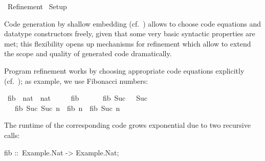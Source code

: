 %
\begin{isabellebody}%
\def\isabellecontext{Refinement}%
%
\isadelimtheory
%
\endisadelimtheory
%
\isatagtheory
{}\isamarkupfalse%
\ Refinement\isanewline
{}\ Setup\isanewline
{}%
\endisatagtheory
{\isafoldtheory}%
%
\isadelimtheory
%
\endisadelimtheory
%
\isamarkuptrue%
%
\begin{isamarkuptext}%
Code generation by shallow embedding (cf.~)
  allows to choose code equations and datatype constructors freely,
  given that some very basic syntactic properties are met; this
  flexibility opens up mechanisms for refinement which allow to extend
  the scope and quality of generated code dramatically.%
\end{isamarkuptext}%
\isamarkuptrue%
%
\isamarkuptrue%
%
\begin{isamarkuptext}%
Program refinement works by choosing appropriate code equations
  explicitly (cf.~\label{sec:equations}); as example, we use Fibonacci
  numbers:%
\end{isamarkuptext}%
\isamarkuptrue%
%
\isadelimquote
%
\endisadelimquote
%
\isatagquote
{}\isamarkupfalse%
\ fib\ {\isacharcolon}{\isacharcolon}\ {\isachardoublequoteopen}nat\ {\isasymRightarrow}\ nat{\isachardoublequoteclose}\ \isanewline
\ \ \ \ {\isachardoublequoteopen}fib\ {}\ {\isacharequal}\ {}{\isachardoublequoteclose}\isanewline
\ \ {\isacharbar}\ {\isachardoublequoteopen}fib\ {\isacharparenleft}Suc\ {}{\isacharparenright}\ {\isacharequal}\ Suc\ {}{\isachardoublequoteclose}\isanewline
\ \ {\isacharbar}\ {\isachardoublequoteopen}fib\ {\isacharparenleft}Suc\ {\isacharparenleft}Suc\ n{\isacharparenright}{\isacharparenright}\ {\isacharequal}\ fib\ n\ {\isacharplus}\ fib\ {\isacharparenleft}Suc\ n{\isacharparenright}{\isachardoublequoteclose}%
\endisatagquote
{\isafoldquote}%
%
\isadelimquote
%
\endisadelimquote
%
\begin{isamarkuptext}%
\noindent The runtime of the corresponding code grows exponential due
  to two recursive calls:%
\end{isamarkuptext}%
\isamarkuptrue%
%
\isadelimquote
%
\endisadelimquote
%
\isatagquote
%
\begin{isamarkuptext}%
\isatypewriter%
\noindent%
\hspace*{0pt}fib ::~Example.Nat -> Example.Nat;\\

\end{isamarkuptext}
\end{isabellebody}
